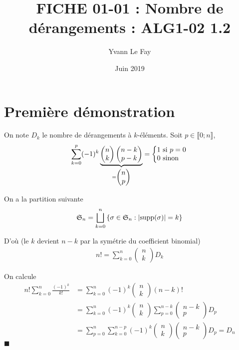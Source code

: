 \documentclass{article}
\newcommand*{\QED}{\hfill\ensuremath{\blacksquare}}%
\begin{document}
\title{FICHE 01-01 : Nombre de dérangements : ALG1-02 1.2}
\author{Yvann Le Fay}
\date{Juin 2019}
\maketitle
\section{Première démonstration}
On note $D_k$ le nombre de dérangements à $k$-éléments.
Soit $p\in \llbracket 0;n\rrbracket$, 
\begin{align*}
\sum_{k=0}^{p}(-1)^k \underbrace{\begin{pmatrix}n\\k\end{pmatrix}\begin{pmatrix} n-k\\p-k\end{pmatrix}}_{=\begin{pmatrix}n\\p\end{pmatrix}} = \left\{
     \begin{array}{@{}l@{\thinspace}l}
      1 \textup{ si } p = 0\\
      0 \textup{ sinon }
     \end{array}
   \right.   
\end{align*}


On a la partition suivante
\begin{align*}
\mathfrak{S}_n = \bigsqcup_{k=0}^{n}{\{\sigma\in\mathfrak{S}_n : |\textup{supp}(\sigma)| = k \}}
\end{align*}

D'où (le $k$ devient $n-k$ par la symétrie du coefficient binomial)
\begin{align*}
n ! = \sum_{k=0}^{n} \begin{pmatrix}n\\k\end{pmatrix}D_k
\end{align*}

On calcule 
\begin{align*}
n!\sum_{k=0}^n \frac{(-1)^k}{k!} &= \sum_{k=0}^n (-1)^k \begin{pmatrix}n\\k\end{pmatrix} (n-k)!\\
&=\sum_{k=0}^n (-1)^k \begin{pmatrix} n\\k\end{pmatrix}\sum_{p=0}^{n-k}\begin{pmatrix}n-k\\p\end{pmatrix}D_p\\
&=\sum_{p=0}^n \sum_{k=0}^{n-p}(-1)^k \begin{pmatrix}
n\\k
\end{pmatrix} \begin{pmatrix}
n-k\\p
\end{pmatrix}D_p = D_n
\end{align*} \QED
\end{document}
